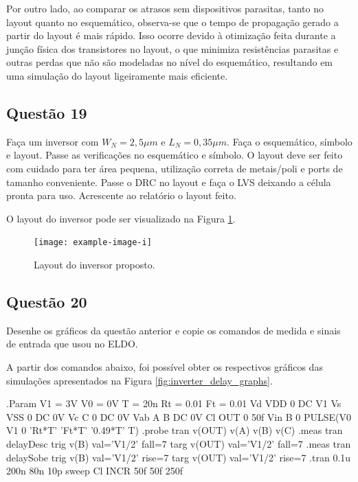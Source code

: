 \documentclass[12pt,a4paper]{article}
\begin{document}
Por outro lado, ao comparar os atrasos sem dispositivos parasitas, tanto no layout quanto no esquemático, observa-se que o tempo de propagação gerado a partir do layout é mais rápido. Isso ocorre devido à otimização feita durante a junção física dos transistores no layout, o que minimiza resistências parasitas e outras perdas que não são modeladas no nível do esquemático, resultando em uma simulação do layout ligeiramente mais eficiente.

\subsection*{Questão 19}

Faça um inversor com $W_N = 2,5 \mu m$ e $L_N = 0,35 \mu m$. Faça o esquemático, símbolo e layout. Passe as verificações no esquemático e símbolo. O layout deve ser feito com cuidado para ter área pequena, utilização correta de metais/poli e ports de tamanho conveniente. Passe o DRC no layout e faça o LVS deixando a célula pronta para uso. Acrescente ao relatório o layout feito.

O layout do inversor pode ser visualizado na Figura \ref{fig:inverter_layout}.

\begin{figure}[H]
    \centering
    \texttt{[image: example-image-i]}
    \caption{Layout do inversor proposto.}
    \label{fig:inverter_layout}
\end{figure}

\subsection*{Questão 20}

Desenhe os gráficos da questão anterior e copie os comandos de medida e sinais de entrada que usou no ELDO.

A partir dos comandos abaixo, foi possível obter os respectivos gráficos das simulações apresentados na Figura \ref{fig:inverter_delay_graphs}.

\begin{codeblock}[title={Comandos ELDO para Inversor}, label={lst:inverter_eldo_commands}, listing options={language=TeX}]
.Param V1 = 3V V0 = 0V T = 20n Rt = 0.01 Ft = 0.01
Vd VDD 0 DC V1
Vs VSS 0 DC 0V
Vc C 0 DC 0V
Vab A B DC 0V
Cl OUT 0 50f
Vin B 0 PULSE(V0 V1 0 'Rt*T' 'Ft*T' '0.49*T' T)
.probe tran v(OUT) v(A) v(B) v(C)
.meas tran delayDesc trig v(B) val='V1/2' fall=7 targ v(OUT) val='V1/2'
fall=7
.meas tran delaySobe trig v(B) val='V1/2' rise=7 targ v(OUT) val='V1/2'
rise=7
.tran 0.1u 200n 80n 10p sweep Cl INCR 50f 50f 250f
\end{codeblock}
\end{document}
